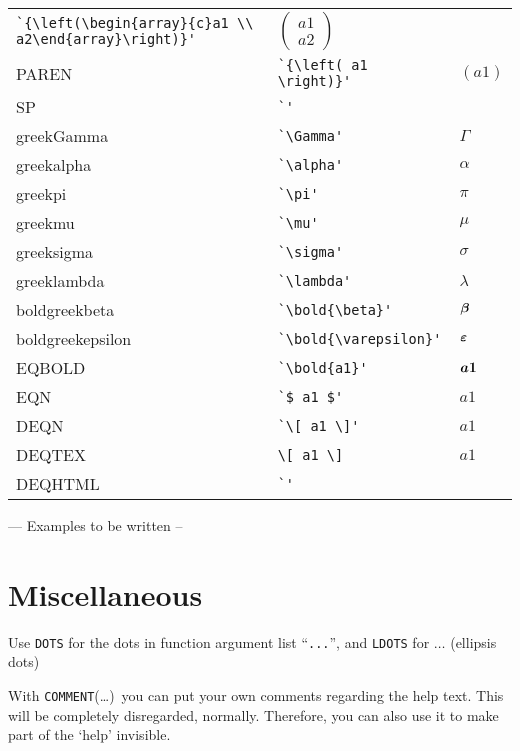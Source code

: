 \documentclass[a4paper]{article}
\newcommand{\bold}[1]{\mbox{\boldmath $#1$}}
\begin{document}
\begin{tabular}{l@{\ \ $\to$\ \ }l@{\ \ $\longrightarrow$\ \ }l}
                    \verb#`{\left(\begin{array}{c}a1 \\ a2\end{array}\right)}'# 
                 & $ {\left(\begin{array}{c} a1 \\ a2 \end{array} \right)} $ \\
PAREN           & \verb#`{\left( a1 \right)}'#  & $ {\left( a1 \right)} $ \\
SP              & \verb#`'#     & $  $ \\
\hline
greekGamma      & \verb#`\Gamma'#       & $ \Gamma $ \\
greekalpha      & \verb#`\alpha'#       & $ \alpha $ \\
greekpi         & \verb#`\pi'#  & $ \pi $ \\
greekmu         & \verb#`\mu'#  & $ \mu $ \\
greeksigma      & \verb#`\sigma'#       & $ \sigma $ \\
greeklambda     & \verb#`\lambda'#      & $ \lambda $ \\
boldgreekbeta   & \verb#`\bold{\beta}'#         & $ \bold{\beta} $ \\
boldgreekepsilon& \verb#`\bold{\varepsilon}'#   & $ \bold{\varepsilon} $ \\
\hline\hline
EQBOLD          & \verb#`\bold{a1}'#    & $ \bold{a1} $ \\
EQN             & \verb#`$ a1 $'#       & $  a1  $ \\
DEQN            & \verb#`\[ a1 \]'#     &  $\displaystyle a1 $  \\
DEQTEX          & \verb#\[ a1 \]#       &  $\displaystyle a1 $  \\
DEQHTML         & \verb#`'#     & $  $ \\
\end{tabular}

\bigskip
--- Examples to be written --
\bigskip

\section{Miscellaneous}
Use \texttt{DOTS} for the dots in function argument list ``\texttt{...}'',
and \texttt{LDOTS} for $\ldots$ (ellipsis dots)

With \texttt{COMMENT}(\dots)\ you can put your own comments regarding the
help text. This will be completely disregarded, normally. Therefore, you
can also use it to make part of the `help' invisible.
\end{document}
